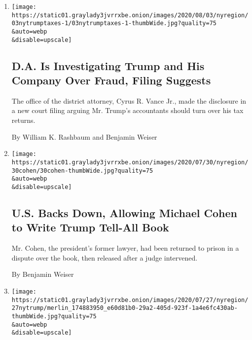 \begin{enumerate}
\def\labelenumi{\arabic{enumi}.}
\item
  \href{/2020/08/03/nyregion/donald-trump-taxes-cyrus-vance.html}{}

  \texttt{[image: https://static01.graylady3jvrrxbe.onion/images/2020/08/03/nyregion/03nytrumptaxes-1/03nytrumptaxes-1-thumbWide.jpg?quality=75\\\&auto=webp\\\&disable=upscale]}

  \hypertarget{da-is-investigating-trump-and-his-company-over-fraud-filing-suggests}{%
  \subsection{D.A. Is Investigating Trump and His Company Over Fraud,
  Filing
  Suggests}\label{da-is-investigating-trump-and-his-company-over-fraud-filing-suggests}}

  The office of the district attorney, Cyrus R. Vance Jr., made the
  disclosure in a new court filing arguing Mr. Trump's accountants
  should turn over his tax returns.

  By William K. Rashbaum and Benjamin Weiser
\item
  \href{/2020/07/30/nyregion/michael-cohen-donald-trump-book.html}{}

  \texttt{[image: https://static01.graylady3jvrrxbe.onion/images/2020/07/30/nyregion/30cohen/30cohen-thumbWide.jpg?quality=75\\\&auto=webp\\\&disable=upscale]}

  \hypertarget{us-backs-down-allowing-michael-cohen-to-write-trump-tell-all-book}{%
  \subsection{U.S. Backs Down, Allowing Michael Cohen to Write Trump
  Tell-All
  Book}\label{us-backs-down-allowing-michael-cohen-to-write-trump-tell-all-book}}

  Mr. Cohen, the president's former lawyer, had been returned to prison
  in a dispute over the book, then released after a judge intervened.

  By Benjamin Weiser
\item
  \href{/2020/07/27/nyregion/donald-trump-taxes-cyrus-vance.html}{}

  \texttt{[image: https://static01.graylady3jvrrxbe.onion/images/2020/07/27/nyregion/27nytrump/merlin\_174883950\_e60d81b0-29a2-405d-923f-1a4e6fc430ab-thumbWide.jpg?quality=75\\\&auto=webp\\\&disable=upscale]}

  \hypertarget{trump-again-tries-to-block-subpoena-for-taxes-calling-it-wildly-overbroad}{%
}
\end{enumerate}
